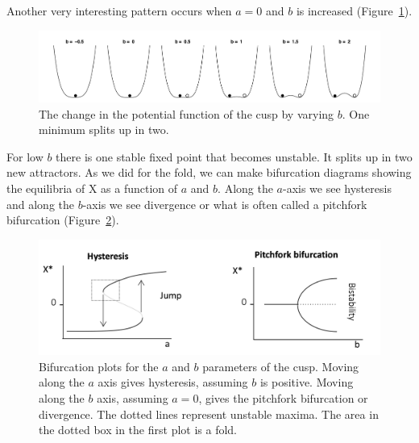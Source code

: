\documentclass[
  a4paper,
  DIV=11,
  numbers=noendperiod,
  oneside]{scrreprt}
\begin{document}
Another very interesting pattern occurs when \(a = 0\) and \(b\) is
increased (Figure~\ref{fig-ch3-img8-old-20}).

\begin{figure}

{\centering \includegraphics{media/ch3/image8.jpg}

}

\caption{\label{fig-ch3-img8-old-20}The change in the potential function
of the cusp by varying \(b\). One minimum splits up in two.}

\end{figure}

For low \(b\) there is one stable fixed point that becomes unstable. It
splits up in two new attractors. As we did for the fold, we can make
bifurcation diagrams showing the equilibria of X as a function of \(a\)
and \(b\). Along the \(a\)-axis we see hysteresis and along the
\(b\)-axis we see divergence or what is often called a pitchfork
bifurcation (Figure~\ref{fig-ch3-img9-old-21}).

\begin{figure}

{\centering \includegraphics{media/ch3/image9.jpg}

}

\caption{\label{fig-ch3-img9-old-21}Bifurcation plots for the \(a\) and
\(b\) parameters of the cusp. Moving along the \(a\) axis gives
hysteresis, assuming \(b\) is positive. Moving along the \(b\) axis,
assuming \(a=0\), gives the pitchfork bifurcation or divergence. The
dotted lines represent unstable maxima. The area in the dotted box in
the first plot is a fold.}

\end{figure}
\end{document}
